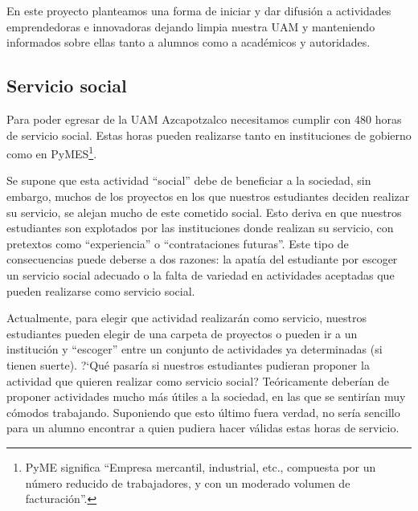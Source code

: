 \documentclass[11pt,letterpaper,titlepage]{article}
\begin{document}
En este proyecto planteamos una forma de iniciar y dar difusi\'on a actividades emprendedoras e innovadoras dejando limpia nuestra UAM y manteniendo informados sobre ellas tanto a alumnos como a acad\'emicos y autoridades.

\subsection{Servicio social}

Para poder egresar de la UAM Azcapotzalco necesitamos cumplir con 480 horas de servicio social. Estas horas pueden realizarse tanto en instituciones de gobierno como en PyMES\footnote{PyME significa ``Empresa mercantil, industrial, etc., compuesta por un n\'umero reducido de trabajadores, y con un moderado volumen de facturaci\'on''.}\cite{rae}.

Se supone que esta actividad ``social'' debe de beneficiar a la sociedad, sin embargo, muchos de los proyectos en los que nuestros estudiantes deciden realizar su servicio, se alejan mucho de este cometido social. Esto deriva en que nuestros estudiantes son explotados por las instituciones donde realizan su servicio, con pretextos como ``experiencia'' o ``contrataciones futuras''. Este tipo de consecuencias puede deberse a dos razones: la apat\'ia del estudiante por escoger un servicio social adecuado o la falta de variedad en actividades aceptadas que pueden realizarse como servicio social.

Actualmente, para elegir que actividad realizar\'an como servicio, nuestros estudiantes pueden elegir de una carpeta de proyectos o pueden ir a un instituci\'on y ``escoger'' entre un conjunto de actividades ya determinadas  (si tienen suerte).  ?`Qu\'e pasar\'ia si nuestros estudiantes pudieran proponer la actividad que quieren realizar como servicio social? Te\'oricamente deber\'ian de proponer actividades mucho m\'as \'utiles a la sociedad, en las que se sentir\'ian muy c\'omodos trabajando. Suponiendo que esto \'ultimo fuera verdad, no ser\'ia sencillo para un alumno encontrar a quien pudiera hacer v\'alidas estas horas de servicio.
\end{document}
